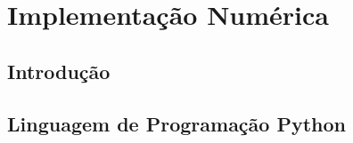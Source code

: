 \chapter{Implementação Numérica}
\label{chapter:cap7}
\section{\textbf{Introdução}}
\section{\textbf{Linguagem de Programação Python}}